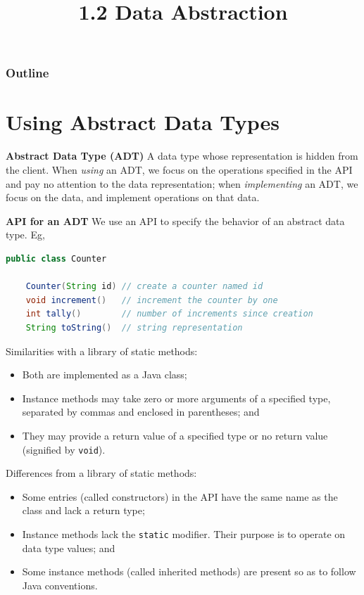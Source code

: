 \documentclass[8pt,a4paper,compress]{beamer}
\title{1.2 Data Abstraction}
\date{}
\begin{document}
\begin{frame}
\vfill
\titlepage
\end{frame}

\begin{frame}
\frametitle{Outline}
\tableofcontents
\end{frame}

\section{Using Abstract Data Types}
\begin{frame}[fragile]
\pause

\textbf{Abstract Data Type (ADT)} A data type whose representation is hidden from the client. When \emph{using} an ADT, we focus on the operations specified in the API and pay no attention to the data representation; when \emph{implementing} an ADT, we focus on the data, and implement operations on that data.

\pause
\smallskip

\textbf{API for an ADT} We use an API to specify the behavior of an abstract data type. Eg, 

\begin{lstlisting}[language=Java]
public class Counter

    Counter(String id) // create a counter named id
    void increment()   // increment the counter by one
    int tally()        // number of increments since creation
    String toString()  // string representation
\end{lstlisting}

\pause
\smallskip

Similarities with a library of static methods:
\begin{itemize}
\item Both are implemented as a Java class;
\item Instance methods may take zero or more arguments of a specified type, separated by commas and enclosed in parentheses; and 
\item They may provide a return value of a specified type or no return value (signified by \lstinline$void$).
\end{itemize}

\pause
\smallskip

Differences from a library of static methods:
\begin{itemize}
\item Some entries (called constructors) in the API have the same name as the class and lack a return type; 
\item Instance methods lack the \lstinline$static$ modifier. Their purpose is to operate on data type values; and
\item Some instance methods (called inherited methods) are present so as to follow Java conventions.
\end{itemize}
\end{frame}
\end{document}
